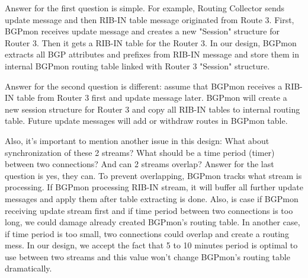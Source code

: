 Answer for the first question is simple. For example, Routing Collector sends update message and then RIB-IN table message originated from Route 3. First, BGPmon receives update message and creates a new "Session" structure for Router 3. Then it gets a RIB-IN table for the Router 3. In our design, BGPmon extracts all BGP attributes and prefixes from RIB-IN message and store them in internal BGPmon routing table linked with Router 3 "Session" structure.

Answer for the second question is different: assume that BGPmon receives a RIB-IN table from Router 3 first and update message later. BGPmon will create a new session structure for Router 3 and copy all RIB-IN tables to internal routing table. Future update messages will add or withdraw routes in BGPmon table. 




Also, it's important to mention another issue in this design: What about synchronization of these 2 streams? What should be a time period (timer) between two connections? And can 2 streams overlap? Answer for the last question is yes, they can. To prevent overlapping, BGPmon tracks what stream is processing. If BGPmon processing RIB-IN stream, it will buffer all further update messages and apply them after table extracting is done. Also, is case if BGPmon receiving update stream first and if time period between two connections is too long, we could damage already created BGPmon's routing table. In another case, if time period is too small, two connections could overlap and create a routing mess. In our design, we accept the fact that 5 to 10 minutes period is optimal to use between two streams and this value won't change BGPmon's routing table dramatically.


